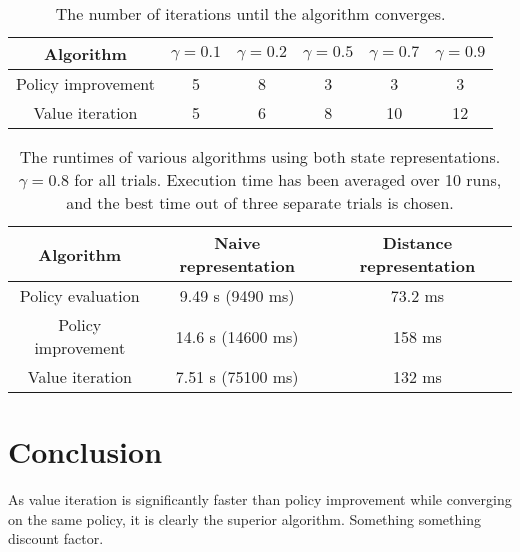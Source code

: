 \documentclass[a4paper, 12pt]{article}
\begin{document}
\begin{table}[htb]
	\begin{tabular}{|c|c|c|c|c|c|}
		\hline
		Algorithm & $\gamma = 0.1$ & $\gamma = 0.2$ & $\gamma = 0.5$ & $\gamma =
		0.7$ & $\gamma = 0.9$ \\
		\hline
		Policy improvement & 5 & 8 & 3 & 3 & 3 \\
		Value iteration & 5 & 6 & 8 & 10 & 12 \\
		\hline
	\end{tabular}
	\caption{The number of iterations until the algorithm converges.}
	\label{tbl:algo_convergence}
\end{table}

\begin{table}[htb]
	\begin{tabular}{|c|c|c|}
		\hline
		Algorithm & Naive representation & Distance representation \\
		\hline
		Policy evaluation & 9.49 s (9490 ms) & 73.2 ms \\
		Policy improvement & 14.6 s (14600 ms) & 158 ms \\
		Value iteration & 7.51 s (75100 ms)& 132 ms \\
		\hline
	\end{tabular}
	\caption{The runtimes of various algorithms using both state representations.
		$\gamma = 0.8$ for all trials. Execution time has been averaged over 10
		runs, and the best time out of three separate trials is chosen.}
	\label{tbl:performance}
\end{table}

\section*{Conclusion}
As value iteration is significantly faster than policy improvement while
converging on the same policy, it is clearly the superior algorithm.
Something something discount factor.
\end{document}
